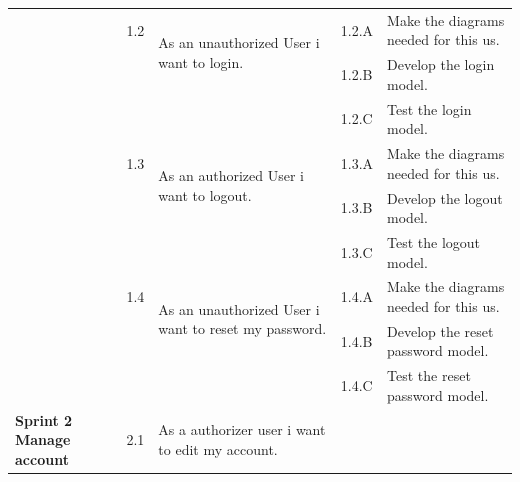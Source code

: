 \documentclass[12pt,a4paper]{report}
\begin{document}
	\begin{table}[H]
	\begin{center}
		\setlength\doublerulesep{0.5pt}
		\begin{tabular}{|  p{3cm}|  p{1cm}| p{4cm}|  p{1cm}| p{6cm}|}
			 \cline{2-5}  
			
			&                       
			1.2  &  
			\multirow{2}{4cm}{As an unauthorized User i want to login.}
			
			&				                      
			1.2.A &                        
				Make the diagrams needed for this \ac{us}.
			\\ 
			\cline{4-5}    
			&                   
			&                                 
			&                        
			1.2.B &                        
			Develop the login model.
				\\ 
			\cline{4-5}    
			&                   
			&                                 
			&                        
			1.2.C &                        
			Test the login model.
			\\
			\cline{2-5}  
			
			&                       
			1.3  &  
			\multirow{2}{4cm}{As an 
				authorized User i want to logout.}
			
			&				                      
			1.3.A &                        
			Make the diagrams needed for this \ac{us}.
			\\ 
			\cline{4-5}    
			&                   
			&                                 
			&                        
			1.3.B &                        
			Develop the logout model.
			\\ 
			\cline{4-5}    
			&                   
			&                                 
			&                        
			1.3.C &                        
			Test the logout model.
			\\
			\cline{2-5}  
			
			&                       
			1.4  &  
			\multirow{2}{4cm}{As an 
				unauthorized User i want to reset my password.}
			
			&				                      
			1.4.A &                        
			Make the diagrams needed for this \ac{us}.
			\\ 
			\cline{4-5}    
			&                   
			&                                 
			&                        
			1.4.B &                        
			Develop the reset password model.
			\\ 
			\cline{4-5}    
			&                   
			&                                 
			&                        
			1.4.C &                        
			Test the reset password model.
			\\ \hline
			\multirow{5}{3cm}{\textbf{Sprint 2} \textbf{Manage account} }
			&                       
			2.1  &  
			\multirow{2}{4cm}{As a authorizer user i want to edit my account.}
			

\end{tabular}
\end{center}
\end{table}
\end{document}
